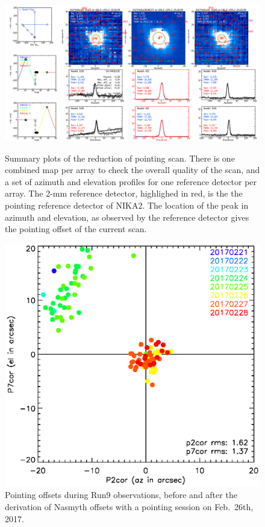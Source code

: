 \begin{figure}[p]
\begin{center}
\includegraphics[clip, angle=0, scale = 0.30]{Figures/plot_20170418s192.png}
\caption{Summary plots of the reduction of pointing scan. There is one combined
  map per array to check the overall quality of the scan, and a set of azimuth
  and elevation profiles for one reference detector per array. The 2-mm reference
  detector, highlighed in red, is the the pointing reference detector of
  NIKA2. The location of the peak in azimuth and elevation, as observed by the
  reference detector gives the pointing offset of the current scan.}
\label{fig:ptg}
\end{center}
\begin{center}
\includegraphics[clip, angle=0, scale = 0.70]{Figures/pointing_stats_N2R9.eps}
\caption{Pointing offsets during Run9 observations, before and after the
  derivation of Nasmyth offsets with a pointing session on Feb.~26th, 2017.}
\label{fig:pointing_stats_n2r9}
\end{center}
\end{figure}

